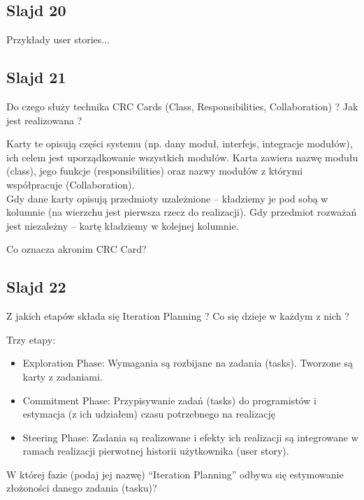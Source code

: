 \documentclass[a4paper,15pt]{article}
\newcommand{\question}[2]{
    \begin{tcolorbox}[colback=mRed!5!white,colframe=mRed,title={Kolokwium 2018 #1}]
        #2
    \end{tcolorbox}
}
\begin{document}
\subsection{Slajd 20}
Przykłady user stories...

\subsection{Slajd 21}
\begin{framed}
Do czego służy technika CRC Cards (Class, Responsibilities, Collaboration) ? Jak jest realizowana ?
\end{framed}
Karty te opisują części systemu (np. dany moduł, interfejs, integracje modułów), ich celem jest uporządkowanie wszystkich modułów. Karta zawiera nazwę modułu (class), jego funkcje (responsibilities) oraz nazwy modułów z którymi współpracuje (Collaboration). \\ Gdy dane karty opisują przedmioty uzależnione – kładziemy je pod sobą w kolumnie (na wierzchu jest pierwsza rzecz do realizacji). Gdy przedmiot rozważań jest niezależny – kartę kładziemy w kolejnej kolumnie.
\question{}{
 Co oznacza akronim CRC Card? 
}

\subsection{Slajd 22}
\begin{framed}
Z jakich etapów składa się Iteration Planning ? Co się dzieje w każdym z nich ?
\end{framed}
Trzy etapy:
\begin{itemize}
\item Exploration Phase: Wymagania są rozbijane na zadania (tasks). Tworzone są karty z zadaniami.
\item Commitment Phase: Przypisywanie zadań (tasks) do programistów i estymacja (z ich udziałem) czasu potrzebnego na realizację
\item Steering Phase: Zadania są realizowane i efekty ich realizacji są integrowane w ramach realizacji pierwotnej historii użytkownika (user story).
\end{itemize}

\question{}{
W której fazie (podaj jej nazwę) “Iteration Planning” odbywa się estymowanie złożoności danego zadania (tasku)? 
}
\end{document}

